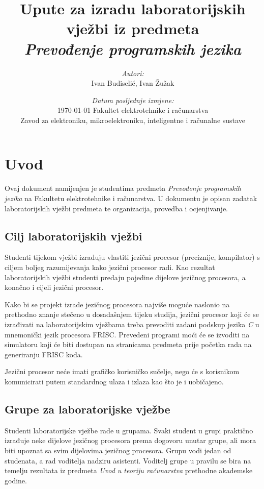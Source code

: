 \documentclass[times, 12pt, utf8]{book}
\title{
\vfill
Upute za izradu laboratorijskih vježbi iz predmeta\\
\emph{Prevođenje programskih jezika}\\
\vspace{70pt}
}
\author{
\emph{Autori:}\\
Ivan Budiselić, Ivan Žužak
}
\date{
\vspace{30pt} 
\emph{Datum posljednje izmjene:}\\
\today
\vfill
Fakultet elektrotehnike i računarstva\\
Zavod za elektroniku, mikroelektroniku, inteligentne i računalne sustave
}
\begin{document}
\maketitle

\let\cleardoublepage\clearpage

\begingroup
\hypersetup{linkcolor=black}
\tableofcontents
\endgroup

\chapter{Uvod}
Ovaj dokument namijenjen je studentima predmeta \emph{Prevođenje programskih jezika} na Fakultetu elektrotehnike i računarstva.
U dokumentu je opisan zadatak laboratorijskih vježbi predmeta te organizacija, provedba i ocjenjivanje.

\section{Cilj laboratorijskih vježbi}
Studenti tijekom vježbi izrađuju vlastiti jezični procesor (preciznije, kompilator) s ciljem boljeg razumijevanja kako jezični procesor radi.
Kao rezultat laboratorijskih vježbi studenti predaju pojedine dijelove jezičnog procesora, a konačno i cijeli jezični procesor.

Kako bi se projekt izrade jezičnog procesora najviše moguće naslonio na prethodno znanje stečeno u dosadašnjem tijeku studija, jezični procesor koji će se izrađivati na laboratorijskim vježbama treba prevoditi zadani podskup jezika \emph{C} u mnemonički jezik procesora FRISC.
Prevedeni programi moći će se izvoditi na simulatoru koji će biti dostupan na stranicama predmeta prije početka rada na generiranju FRISC koda.

Jezični procesor neće imati grafičko korisničko sučelje, nego će s korisnikom komunicirati putem standardnog ulaza i izlaza kao što je i uobičajeno.

\section{Grupe za laboratorijske vježbe}
Studenti laboratorijske vježbe rade u grupama.
Svaki student u grupi praktično izrađuje neke dijelove jezičnog procesora prema dogovoru unutar grupe, ali mora biti upoznat sa svim dijelovima jezičnog procesora.
Grupu vodi jedan od studenata, a rad voditelja nadziru asistenti.
Voditelj grupe u pravilu se bira na temelju rezultata iz predmeta \emph{Uvod u teoriju računarstva} prethodne akademske godine.
\end{document}
